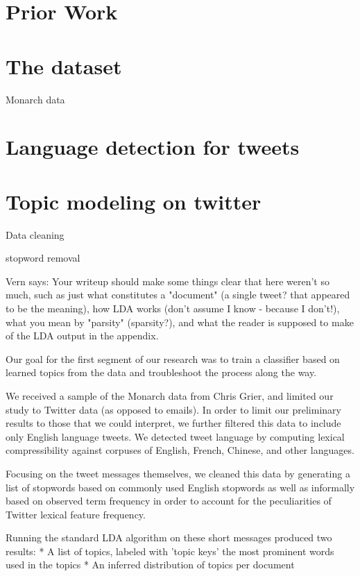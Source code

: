 \documentclass[times, 11pt, twocolumn]{article}
\begin{document}
\section{Prior Work}

\section{The dataset}

Monarch data



\section{Language detection for tweets}

\section{Topic modeling on twitter}

Data cleaning 

stopword removal



Vern says: Your writeup should make some things clear that here weren't so much, such as just what constitutes a "document" (a single tweet? that appeared to be the meaning), how LDA works (don't assume I know - because I don't!), what you mean by "parsity" (sparsity?), and what the reader is supposed to make of the      LDA output in the appendix.

Our  goal for the first segment of our research was to train a classifier  based on learned topics from the data and troubleshoot the process along  the way.

We received a sample of the Monarch data from Chris Grier, and limited our study to Twitter data (as opposed to emails).  In order to limit our preliminary results to those that we could interpret, we further filtered this data to include only English language tweets.  We detected tweet language by computing lexical compressibility against corpuses of English, French, Chinese, and other languages.

Focusing on the tweet messages themselves, we cleaned this data by generating a list of stopwords based on commonly used English stopwords as well as informally based on observed term frequency in order to account for the peculiarities of Twitter lexical feature frequency.

Running the standard LDA algorithm on these short messages produced two results:
	* A list of topics, labeled with 'topic keys'  the most prominent words used in the topics
	* An inferred distribution of topics per document
    
\end{document}
